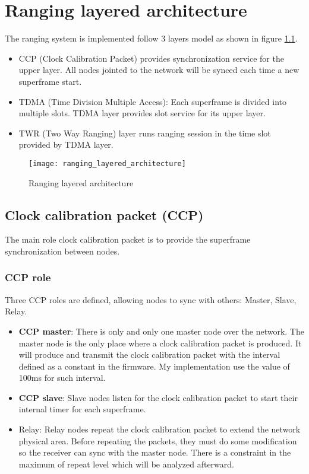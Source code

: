 \documentclass[./main.tex]{subfiles}
\begin{document}
\chapter{Ranging layered architecture}

The ranging system is implemented follow 3 layers model as shown in figure \ref{fig:ranging_layered_architecture}. 
\begin{itemize}
    \item CCP (Clock Calibration Packet) provides synchronization service for the upper layer. All nodes jointed to the network will be synced each time a new superframe start.
    \item TDMA (Time Division Multiple Access): Each superframe is divided into multiple slots. TDMA layer provides slot service for its upper layer. 
    \item TWR (Two Way Ranging) layer runs ranging session in the time slot provided by TDMA layer.
\end{itemize}
\begin{figure}[ht]
    \begin{center}
        \texttt{[image: ranging\_layered\_architecture]}
    \end{center}
    \caption{Ranging layered architecture}
    \label{fig:ranging_layered_architecture}
\end{figure}

\section{Clock calibration packet (CCP)}
The main role clock calibration packet is to provide the superframe synchronization between nodes. 
\subsection{CCP role}
Three CCP roles are defined, allowing nodes to sync with others: Master, Slave, Relay.
\begin{itemize}
    \item \textbf{CCP master}: There is only and only one master node over the network. The master node is the only place where a clock calibration packet is produced. It will produce and transmit the clock calibration packet with the interval defined as a constant in the firmware. My implementation use the value of 100ms for such interval. 
    \item \textbf{CCP slave}: Slave nodes listen for the clock calibration packet to start their internal timer for each superframe.
    \item Relay: Relay nodes repeat the clock calibration packet to extend the network physical area. Before repeating the packets, they must do some modification so the receiver can sync with the  master node. There is a constraint in the maximum of repeat level which will be analyzed afterward.
\end{itemize}
\end{document}
